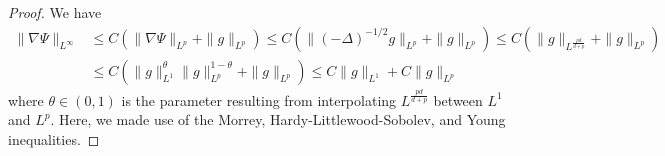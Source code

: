 \documentclass[10pt,a4paper]{amsart}
\newcommand{\be}{\begin{equation}}
\newcommand{\ee}{\end{equation}}
\begin{document}
\begin{proof}
    We have
    \be 
\begin{aligned}
\|\nabla\Psi\|_{L^\infty} 
&\le C(\|\nabla\Psi\|_{L^p} +\|g\|_{L^p}) 
\le C(\|(-\Delta)^{-1/2}g\|_{L^p} + \|g\|_{L^p}) 
\le C(\|g\|_{L^\frac{pd}{d+p}} + \|g\|_{L^p})
\\&\le C(\|g\|_{L^1}^\theta \|g\|_{L^p}^{1-\theta} + \|g\|_{L^p}) 
\le C\|g\|_{L^1} + C\|g\|_{L^p}
\end{aligned}
\ee where $\theta \in (0,1)$ is the parameter resulting from interpolating $L^{\frac{pd}{d+p}}$ between $L^1$ and $L^p$. Here, we made use of the Morrey, Hardy-Littlewood-Sobolev, and Young inequalities.
\end{proof}
\end{document}
